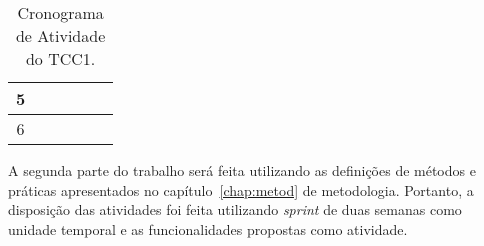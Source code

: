 \begin{table}[H]
\begin{tabular}{|c|l|l|l|l|l|}
    5                                         &                                                                                    &                                                                                    & \cellcolor[HTML]{9B9B9B}                                                          & \cellcolor[HTML]{9B9B9B}                                                           &                                                                                    \\ \hline
    6                                         &                                                                                    &                                                                                    &                                                                                   & \cellcolor[HTML]{9B9B9B}                                                           & \cellcolor[HTML]{9B9B9B}                                                           \\ \hline
  \end{tabular}
  \caption{Cronograma de Atividade do TCC1.}
  \label{tab:cronograma}
\end{table}

A segunda parte do trabalho será feita utilizando as definições de
métodos e práticas apresentados no capítulo~\ref{chap:metod} de metodologia.
Portanto, a disposição das atividades foi feita utilizando \textit{sprint} de
duas semanas como unidade temporal e as funcionalidades propostas como
atividade.

